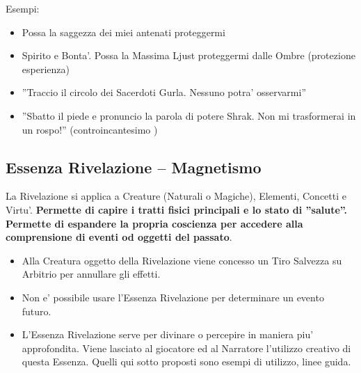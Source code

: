 \documentclass[a4paper,11pt,twoside,openany]{book}
\begin{document}
\bigskip


Esempi:
\begin{itemize}
\item 
Possa la saggezza dei miei antenati proteggermi 
\item 
Spirito e Bonta'. Possa la Massima Ljust proteggermi dalle Ombre (protezione esperienza) 
\item 
''Traccio il circolo dei Sacerdoti Gurla. Nessuno potra' osservarmi'' 
\item 
''Sbatto il piede e pronuncio la parola di potere Shrak. Non mi trasformerai in un rospo!'' (controincantesimo )
\end{itemize}

\pagebreak

\subsection{Essenza Rivelazione -- Magnetismo}

\label{essenza-rivelazione---magnetismo}

La Rivelazione si applica a Creature (Naturali o Magiche), Elementi, Concetti e Virtu'. \textbf{Permette di capire i tratti fisici principali e lo stato di ''salute''. Permette di espandere la propria coscienza per accedere alla comprensione di eventi od oggetti del passato}.
\begin{itemize}
\item 
Alla Creatura oggetto della Rivelazione viene concesso un Tiro Salvezza
su Arbitrio per annullare gli effetti. 
\item 
Non e' possibile usare l'Essenza Rivelazione per determinare un evento futuro. 
\item 
L'Essenza Rivelazione serve per divinare o percepire in maniera piu' approfondita. Viene lasciato al giocatore ed al Narratore l'utilizzo creativo di questa Essenza. Quelli qui sotto proposti sono esempi di utilizzo, linee guida. 
\end{itemize}

\bigskip
\end{document}
